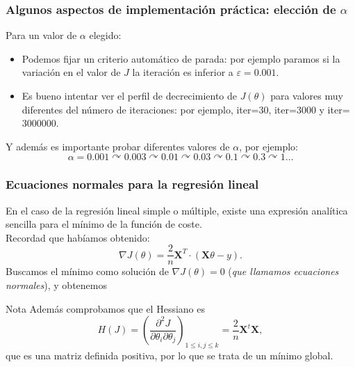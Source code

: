 \documentclass[aspectratio=169]{beamer}
\begin{document}
\begin{frame}
\frametitle{Algunos aspectos de implementación práctica: elección de $\alpha$}
\begin{overlayarea}{\textwidth}{8cm}
Para un valor de $\alpha$ elegido: 
\begin{itemize}
\item Podemos fijar un criterio automático de parada: por ejemplo paramos si la variación en el valor de $J$ la iteración es inferior a $\varepsilon=0.001$.
\item Es bueno intentar ver el perfil de decrecimiento de $J(\theta)$ para valores muy diferentes del número de iteraciones: por ejemplo, iter=30, iter=3000 y iter= 3000000.

\end{itemize}
\begin{block}{Y además es importante}
probar diferentes valores de $\alpha$, por ejemplo:
$$\alpha=0.001\curvearrowright 0.003\curvearrowright0.01\curvearrowright0.03\curvearrowright0.1\curvearrowright0.3\curvearrowright1\ldots$$

\end{block}

\end{overlayarea}
\end{frame}
\begin{frame}
\frametitle{Ecuaciones normales para la regresión lineal}
En el caso de la regresión lineal simple o múltiple, existe una expresión analítica sencilla para el mínimo de la función de coste.\\
 Recordad que habíamos obtenido:
$$ \nabla J(\theta)=\frac 2 n\mathbf{X}^T\cdot \left(\mathbf{X}\theta-y\right).$$
Buscamos el mínimo como solución de $\nabla J(\theta)=0$ (\textit{que llamamos ecuaciones normales}), y obtenemos 
\begin{center}
\end{center}
\begin{block}{\scriptsize Nota}
\scriptsize  Además comprobamos que el Hessiano es 
$$H(J)=\left(\frac{\partial^2 J}{\partial\theta_i\partial\theta_j}\right)_{1\leq i,j\leq k}=\frac 2 n\mathbf{X}^t\mathbf{X},$$
que es una matriz definida positiva, por lo que se trata de un mínimo global.

\end{block}
\end{frame}
\end{document}
